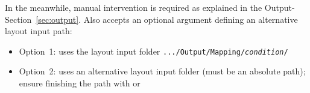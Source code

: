 In the meanwhile, manual intervention is required as explained in the Output-Section~\ref{sec:output}. Also  accepts an optional argument defining an alternative layout input path:
\begin{itemize}
	\item Option~1:  uses the layout input folder \texttt{.../Output/Mapping/\textit{condition}/} 
	\item Option~2:  uses an alternative layout input folder (must be an absolute path); ensure finishing the path with  or 
\end{itemize}


